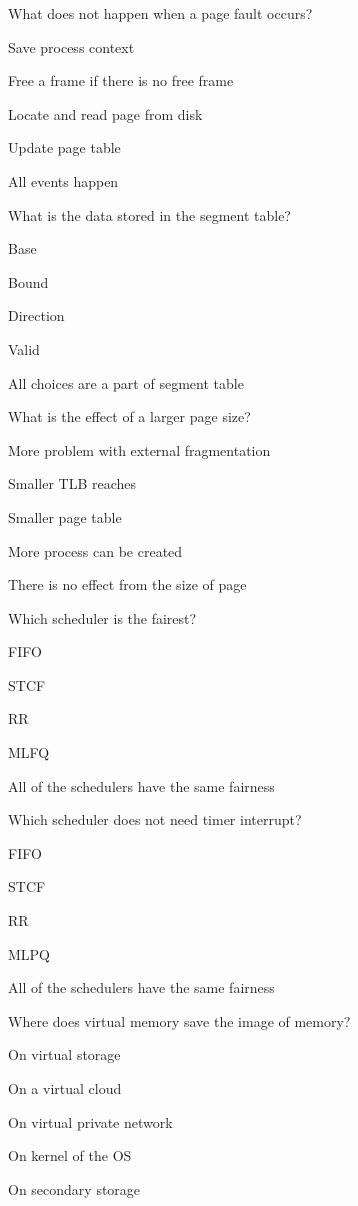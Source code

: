 \begin{questions}\setlength{\itemsep}{0.08cm}\setcounter{question}{23}
\question What does not happen when a page fault occurs?
\begin{verticalchoices}
\item Save process context
\item Free a frame if there is no free frame
\item Locate and read page from disk
\item Update page table
\item All events happen
\end{verticalchoices}
\question What is the data stored in the segment table?
\begin{verticalchoices}
\item Base
\item Bound
\item Direction
\item Valid
\item All choices are a part of segment table
\end{verticalchoices}
\question What is the effect of a larger page size?
\begin{verticalchoices}
\item More problem with external fragmentation
\item Smaller TLB reaches
\item Smaller page table
\item More process can be created
\item There is no effect from the size of page
\end{verticalchoices}
\question Which scheduler is the fairest?
\begin{verticalchoices}
\item FIFO
\item STCF
\item RR
\item MLFQ
\item All of the schedulers have the same fairness
\end{verticalchoices}
\question Which scheduler does not need timer interrupt?
\begin{verticalchoices}
\item FIFO
\item STCF
\item RR
\item MLPQ
\item All of the schedulers have the same fairness
\end{verticalchoices}
\question Where does virtual memory save the image of memory?
\begin{verticalchoices}
\item On virtual storage
\item On a virtual cloud
\item On virtual private network
\item On kernel of the OS
\item On secondary storage
\end{verticalchoices}
\end{questions}\vfill\newpage

